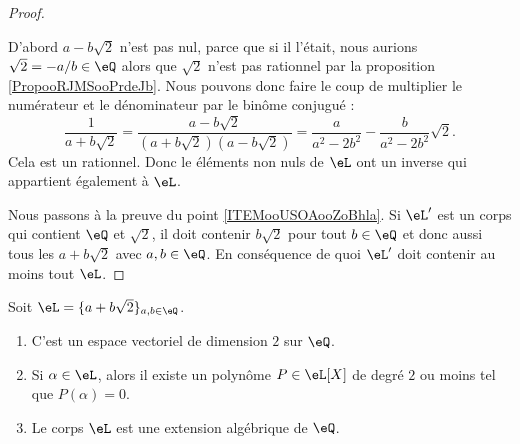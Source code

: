 \begin{proof}
\begin{itemize}
            D'abord \( a-b\sqrt{ 2 }\) n'est pas nul, parce que si il l'était, nous aurions \( \sqrt{ 2 }=-a/b\in \eQ\) alors que \( \sqrt{ 2 }\) n'est pas rationnel par la proposition \ref{PropooRJMSooPrdeJb}. Nous pouvons donc faire le coup de multiplier le numérateur et le dénominateur par le binôme conjugué :
            \begin{equation}
                \frac{1}{ a+b\sqrt{ 2 } }=\frac{ a-b\sqrt{ 2 } }{ (a+b\sqrt{ 2 })(a-b\sqrt{ 2 }) }=\frac{ a }{ a^2-2b^2 }-\frac{ b }{ a^2-2b^2 }\sqrt{ 2 }.
            \end{equation}
            Cela est un rationnel. Donc le éléments non nuls de \( \eL\) ont un inverse qui appartient également à \( \eL\).
    \end{itemize}
    Nous passons à la preuve du point \ref{ITEMooUSOAooZoBhla}. Si \( \eL'\) est un corps qui contient \( \eQ\) et \( \sqrt{ 2 }\), il doit contenir \( b\sqrt{ 2 }\) pour tout \( b\in \eQ\) et donc aussi tous les \( a+b\sqrt{ 2 }\) avec \( a,b\in \eQ\). En conséquence de quoi \( \eL'\) doit contenir au moins tout \( \eL\).
\end{proof}

\begin{proposition}
    Soit \( \eL=\{ a+b\sqrt{ 2 } \}_{a,b\in \eQ}\).
    \begin{enumerate}
        \item   \label{ITEMooOMDMooLNhlyh}
            C'est un espace vectoriel de dimension \( 2\) sur \( \eQ\).
        \item       \label{ITEMooWGGDooSbsesf}
            Si \( \alpha\in \eL\), alors il existe un polynôme \( P\in \eL[X]\) de degré \( 2\) ou moins tel que \( P(\alpha)=0\).
        \item   \label{ITEMooPNNYooPtKYwQ}
            Le corps \( \eL\) est une extension algébrique de \( \eQ\).
    \end{enumerate}
\end{proposition}

